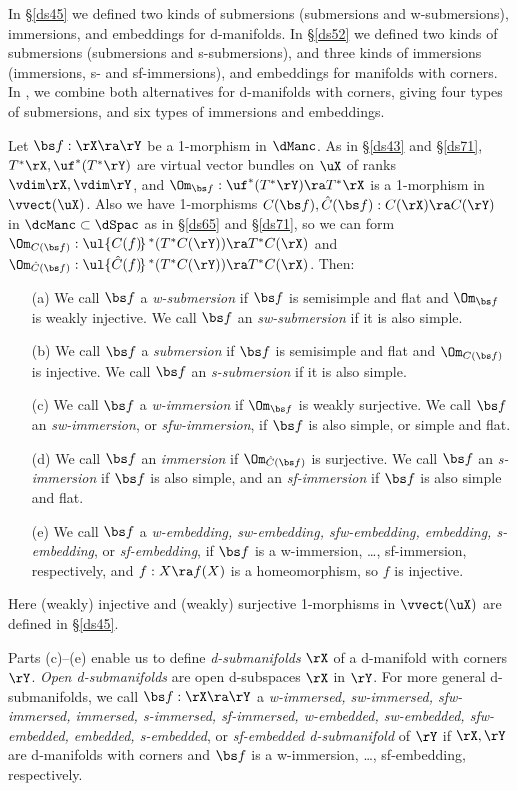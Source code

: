 \documentclass{article}
\begin{document}
In \S\ref{ds45} we defined two kinds of submersions (submersions and
w-submersions), immersions, and embeddings for d-manifolds. In
\S\ref{ds52} we defined two kinds of submersions (submersions and
s-submersions), and three kinds of immersions (immersions, s- and
sf-immersions), and embeddings for manifolds with corners. In
\cite[\S 7.5]{Joyc6}, we combine both alternatives for d-manifolds
with corners, giving four types of submersions, and six types of
immersions and embeddings.

\begin{dfn} Let $\bs f:\rX\ra\rY$ be a 1-morphism in $\dManc$. As in
\S\ref{ds43} and \S\ref{ds71}, $T^*\rX,\uf^*(T^*\rY)$ are virtual
vector bundles on $\uX$ of ranks $\vdim\rX,\vdim\rY$, and $\Om_{\bs
f}:\uf^*(T^*\rY)\ra T^*\rX$ is a 1-morphism in $\vvect(\uX)$. Also
we have 1-morphisms $C(\bs f),\hat C(\bs f):C(\rX)\ra C(\rY)$ in
$\dcManc\subset\dSpac$ as in \S\ref{ds65} and \S\ref{ds71}, so we
can form $\Om_{C(\bs f)}:\ul{\smash{C(f)\!}}\,^*(T^*C(\rY))\ra
T^*C(\rX)$ and $\Om_{\smash{\hat C(\bs f)}}:\ul{\smash{\hat
C(f)\!}}\,^*(T^*C(\rY))\ra T^*C(\rX)$. Then:
\begin{itemize}
\setlength{\itemsep}{0pt}
\setlength{\parsep}{0pt}
\item[(a)] We call $\bs f$ a {\it w-submersion\/} if $\bs f$ is
semisimple and flat and $\Om_{\bs f}$ is weakly injective. We
call $\bs f$ an {\it sw-submersion\/} if it is also simple.
\item[(b)] We call $\bs f$ a {\it submersion\/} if $\bs f$ is
semisimple and flat and $\Om_{C(\bs f)}$ is injective. We call
$\bs f$ an {\it s-submersion\/} if it is also simple.
\item[(c)] We call $\bs f$ a {\it w-immersion\/} if $\Om_{\bs f}$ is
weakly surjective. We call $\bs f$ an {\it sw-immersion}, or
{\it sfw-immersion}, if $\bs f$ is also simple, or simple and
flat.
\item[(d)] We call $\bs f$ an {\it immersion\/} if
$\Om_{\smash{\hat C(\bs f)}}$ is surjective. We call $\bs f$ an
{\it s-immersion\/} if $\bs f$ is also simple, and an {\it
sf-immersion\/} if $\bs f$ is also simple and flat.
\item[(e)] We call $\bs f$ a {\it w-embedding, sw-embedding,
sfw-embedding, embedding, s-embedding}, or {\it sf-embedding},
if $\bs f$ is a w-immersion, \ldots, sf-immersion, respectively,
and $f:X\ra f(X)$ is a homeomorphism, so $f$ is injective.
\end{itemize}
Here (weakly) injective and (weakly) surjective 1-morphisms in
$\vvect(\uX)$ are defined in \S\ref{ds45}.

Parts (c)--(e) enable us to define {\it d-submanifolds\/} $\rX$ of a
d-manifold with corners $\rY$. {\it Open d-submanifolds\/} are open
d-subspaces $\rX$ in $\rY$. For more general d-submanifolds, we call
$\bs f:\rX\ra\rY$ a {\it w-immersed, sw-immersed, sfw-immersed,
immersed, s-immersed, sf-immersed, w-embedded, sw-embedded,
sfw-embedded, embedded, s-embedded}, or {\it sf-embedded
d-submanifold\/} of $\rY$ if $\rX,\rY$ are d-manifolds with corners
and $\bs f$ is a w-immersion, \ldots, sf-embedding,
respectively.
\label{ds7def3}
\end{dfn}
\end{document}
